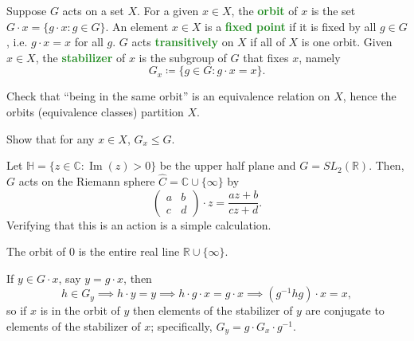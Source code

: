 \documentclass[11pt]{scrartcl}
\providecommand{\CC}{\mathbb C}
\providecommand{\RR}{\mathbb R}
\providecommand{\inv}{^{-1}}
\providecommand{\vocab}[1]{{\textbf{\textcolor{ForestGreen}{#1}}}}
\begin{document}
\begin{definition}
    \label{def:orbit-stab}
    Suppose $G$ acts on a set $X$. For a given $x\in X$,
    the \vocab{orbit} of $x$ is the set $G\cdot x = \{g\cdot x : g\in G\}$.
    An element $x\in X$ is a \vocab{fixed point} if it is fixed by all $g\in G$,
    i.e. $g\cdot x = x$ for all $g$.
    $G$ acts \vocab{transitively} on $X$ if all of $X$ is one orbit.
    Given $x\in X$, the \vocab{stabilizer} of $x$ is
    the subgroup of $G$ that fixes $x$, namely
    \begin{equation*}
	G_x \coloneq \{g\in G : g\cdot x = x\}.
    \end{equation*}
\end{definition}

\begin{exercise}
    Check that ``being in the same orbit'' is an equivalence relation
    on $X$, hence the orbits (equivalence classes) partition $X$.
\end{exercise}

\begin{exercise}
    Show that for any $x\in X$, $G_x\le G$.
\end{exercise}

\begin{example}
    Let $\mathbb H = \{z\in\CC : \operatorname{Im}(z)>0\}$
    be the upper half plane and $G = SL_2(\RR)$.
    Then, $G$ acts on the Riemann sphere $\hat C = \CC\cup\{\infty\}$ by
    \begin{equation*}
        \begin{pmatrix}
	    a&b\\c&d
        \end{pmatrix} \cdot z =
	\frac{az+b}{cz+d}.
    \end{equation*}
    Verifying that this is an action is a simple calculation.
    
    The orbit of $0$ is the entire real line $\RR\cup\{\infty\}$.
\end{example}

If $y\in G\cdot x$, say $y = g\cdot x$, then
\begin{equation*}
    h\in G_y\implies h\cdot y = y \implies
    h\cdot g\cdot x = g\cdot x \implies (g\inv hg)\cdot x = x,
\end{equation*}
so if $x$ is in the orbit of $y$ then elements of the stabilizer of $y$
are conjugate to elements of the stabilizer of $x$;
specifically, $G_y = g\cdot G_x \cdot g\inv$.
\end{document}
